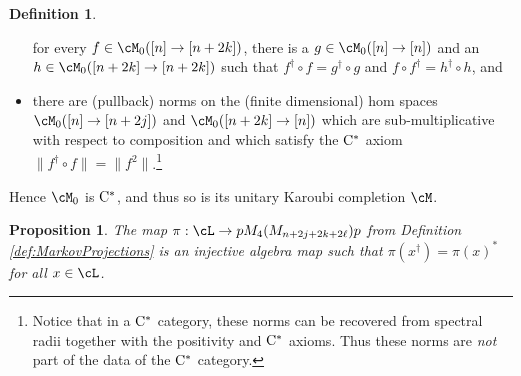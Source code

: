 \documentclass[11pt]{article}
\theoremstyle{plain}
\newtheorem{prop}[thm]{Proposition}
\theoremstyle{definition}
\newtheorem{defn}[thm]{Definition}
\newcommand{\Cstar}{\rm{C^*}}
\begin{document}
\begin{defn}
\begin{itemize}
for every $f\in \cM_0([n]\to [n+2k])$, there is a $g\in \cM_0([n] \to [n])$ and an $h\in \cM_0([n+2k]\to [n+2k])$ such that 
$f^\dag \circ f = g^\dag \circ g$ and $f\circ f^\dag = h^\dag \circ h$, and
\item
there are (pullback) norms on the (finite dimensional) hom spaces $\cM_0([n]\to [n+2j])$ and $\cM_0([n+2k] \to [n])$ which are sub-multiplicative with respect to composition and which satisfy the $\Cstar$ axiom $\|f^\dag \circ f \| = \|f^2\|$.\footnote{
Notice that in a $\Cstar$ category, these norms can be recovered from spectral radii together with the positivity and $\Cstar$ axioms.
Thus these norms are \emph{not} part of the data of the $\Cstar$ category.
}
\end{itemize}
Hence $\cM_0$ is $\Cstar$, and thus so is its unitary Karoubi completion $\cM$.
\end{defn}


\begin{prop}
\label{prop:InjectiveAlgebraMap}
The map $\pi: \cL \to pM_4(M_{n+2j+2k+2\ell})p$ from Definition \ref{def:MarkovProjections} is an injective algebra map such that $\pi(x^\dag) = \pi(x)^*$ for all $x\in \cL$.
\end{prop}
\end{document}
